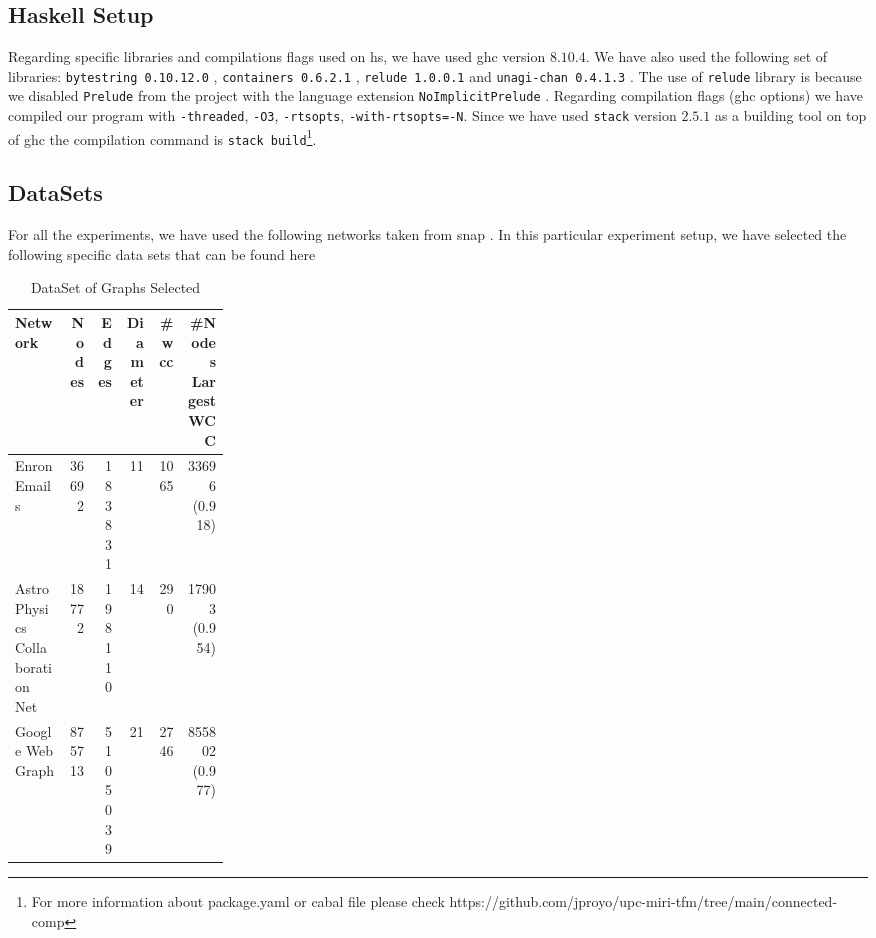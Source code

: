 \subsection{Haskell Setup}
Regarding specific libraries and compilations flags used on \acrshort{hs}, we have used \acrshort{ghc} version $8.10.4$. We have also used the following set of libraries: \texttt{bytestring 0.10.12.0} \cite{bytestring}, \texttt{containers 0.6.2.1} \cite{containers}, \texttt{relude 1.0.0.1} \cite{relude} and \texttt{unagi-chan 0.4.1.3} \cite{unagi}. The use of \texttt{relude} library is because we disabled \texttt{Prelude} from the project with the language extension \texttt{NoImplicitPrelude} \cite{extensions}. Regarding compilation flags (\acrshort{ghc} options) we have compiled our program with \texttt{-threaded}, \texttt{-O3}, \texttt{-rtsopts}, \texttt{-with-rtsopts=-N}. Since we have used \texttt{stack} version $2.5.1$ \cite{stack} as a building tool on top of \acrshort{ghc} the compilation command is \texttt{stack build}\footnote{For more information about package.yaml or cabal file please check https://github.com/jproyo/upc-miri-tfm/tree/main/connected-comp}.

\subsection{DataSets}\label{data:set}

For all the experiments, we have used the following networks taken from \acrshort{snap} \cite{stanford}. In this particular experiment setup, we have selected the following specific data sets that can be found here \cite{netenron, netastro, netwebgoogle}

\begin{table}[H]
  \centering
  \begin{tabular}{|p{0.25\linewidth}|r|r|r|r|r|}
   \hline
   \textbf{Network} & \textbf{Nodes} & \textbf{Edges} & \textbf{Diameter} & \textbf{\#\acrshort{wcc}} & \textbf{\#Nodes Largest WCC} \\
   \hline
   Enron Emails & 36692 & 183831 & 11 & 1065 & 33696 (0.918) \\
   \hline
   Astro Physics Collaboration Net & 18772 & 198110 & 14 & 290 & 17903 (0.954)\\
   \hline
   Google Web Graph & 875713 & 5105039 & 21 & 2746 & 855802 (0.977)\\
   \hline
  \end{tabular}
 \caption{DataSet of Graphs Selected}
 \label{table:4}
 \end{table}
 
